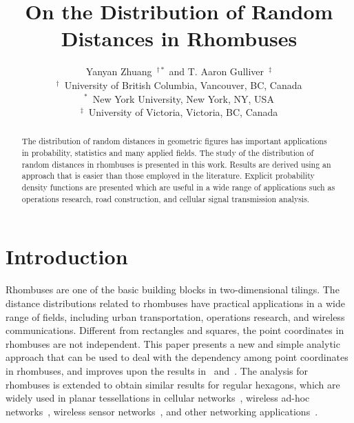 \documentclass[12pt,draftclsnofoot,onecolumn]{IEEEtran}
\begin{document}
\title{On the Distribution of Random\\Distances in Rhombuses}

\author{Yanyan Zhuang~$^{\dagger *}$ and T. Aaron Gulliver~$^\ddagger$\\
$^\dagger$~University of British Columbia, Vancouver, BC, Canada\\
$^*$~New York University, New York, NY, USA\\
$^\ddagger$~University of Victoria, Victoria, BC, Canada}

\maketitle
\thispagestyle{empty}

\begin{abstract}
The distribution of random distances in geometric figures has important
applications in probability, statistics and many applied fields.
The study of the distribution of random distances in rhombuses is presented in this work.
Results are derived using an approach that is easier than those employed in the literature.
Explicit probability density functions are presented which are useful in a wide range of applications
such as operations research, road construction, and cellular signal transmission analysis.
\end{abstract}

\section{Introduction}
Rhombuses are one of the basic building blocks in two-dimensional tilings. The
distance distributions related to rhombuses have practical applications in a
wide range of fields, including urban transportation, operations research, and wireless communications.
Different from rectangles and squares, the point coordinates in rhombuses are not independent.
This paper presents a new and simple analytic approach that can be used
to deal with the dependency among point coordinates in rhombuses, and improves upon the results in~\cite{zhuang2011random}
and~\cite{zhuang2012geometrical}.
The analysis for rhombuses is extended to obtain similar results for regular hexagons, which
are widely used in planar tessellations in cellular
networks~\cite{zhuang2011geometric}, wireless ad-hoc
networks~\cite{zhuang2013planar}, wireless sensor
networks~\cite{schwiebert2001research, chang2008hexagonal, wang2009analytical},
and other networking applications~\cite{baltzis2012distance}.
\end{document}
